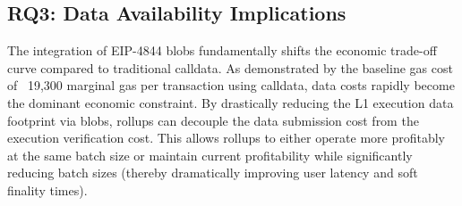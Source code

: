 \subsection{RQ3: Data Availability Implications}
\label{sec:data_availability_discussion}
The integration of EIP-4844 blobs fundamentally shifts the economic trade-off curve compared to traditional calldata. As demonstrated by the baseline gas cost of ~19,300 marginal gas per transaction using calldata, data costs rapidly become the dominant economic constraint. By drastically reducing the L1 execution data footprint via blobs, rollups can decouple the data submission cost from the execution verification cost. This allows rollups to either operate more profitably at the same batch size or maintain current profitability while significantly reducing batch sizes (thereby dramatically improving user latency and soft finality times).
